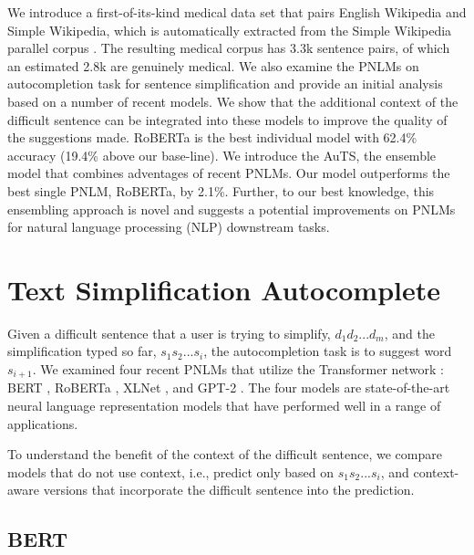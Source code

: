 \documentclass[11pt]{article}
\begin{document}
 We introduce a first-of-its-kind medical data set that pairs English Wikipedia and Simple Wikipedia, which is automatically extracted from the Simple Wikipedia parallel corpus \cite{kauchak2013improving}. The resulting medical corpus has 3.3k sentence pairs, of which an estimated 2.8k are genuinely medical.
 We also examine the PNLMs on autocompletion task for sentence simplification and provide an initial analysis based on a number of recent models. We show that the additional context of the difficult sentence can be integrated into these models to improve the quality of the suggestions made.  RoBERTa is the best individual model with 62.4\% accuracy (19.4\% above our base-line).
 We introduce the AuTS, the ensemble model that combines adventages of recent PNLMs. Our model outperforms the best single PNLM, RoBERTa, by 2.1\%. Further, to our best knowledge, this ensembling approach is novel and suggests a potential improvements on PNLMs for natural language processing (NLP) downstream tasks.


\section{Text Simplification Autocomplete}

Given a difficult sentence that a user is trying to simplify, $d_1 d_2 ... d_m$, and the simplification typed so far, $s_1 s_2 ... s_i$, the autocompletion task is to suggest word $s_{i+1}$.   We examined four recent PNLMs that utilize the Transformer network \cite{vaswani2017attention}: BERT \cite{devlin2018bert}, RoBERTa \cite{liu2019roberta}, XLNet \cite{yang2019xlnet}, and GPT-2 \cite{radford2019language}. The four models are state-of-the-art neural language representation models that have performed well in a range of applications.

To understand the benefit of the context of the difficult sentence, we compare models that do not use context, i.e., predict only based on $s_1 s_2 ... s_i$, and context-aware versions that incorporate the difficult sentence into the prediction.



\subsection{BERT}
\end{document}
